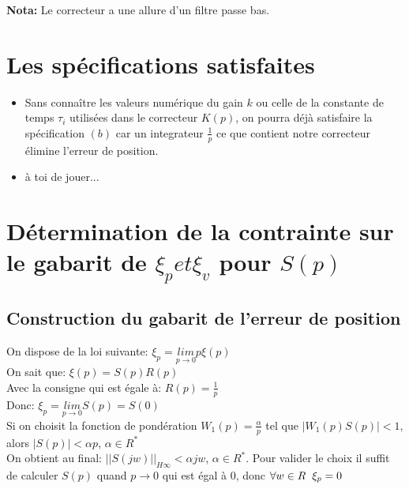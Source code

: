 \documentclass[12pt, a4paper, openany]{report}
\begin{document}
  \begin{center}
    \label{fig3}
  \end{center}

  \textbf{Nota:} \hspace{2mm} Le correcteur a une allure d'un filtre passe bas.

 \section{Les spécifications satisfaites}
 
  \begin{itemize} [label=,font=\small \color{black}]
  	\item Sans connaître les valeurs numérique du gain $k$ ou celle de la constante de temps $\tau_{i}$ utilisées dans le correcteur $K(p)$, on pourra déjà satisfaire la spécification $(b)$ car un integrateur $\frac{1}{p}$ ce que contient notre correcteur élimine l'erreur de position.
    \item à toi de jouer...
  \end{itemize}
 
 \section{Détermination de la contrainte sur le gabarit de $\xi_{p} et \xi_{v} $ pour $S(p)$}  
 
  \subsection{Construction du gabarit de l'erreur de position}
  
   On dispose de la loi suivante: \hspace{5mm} $\xi_{p}=\underset{p\longrightarrow 0}{lim}  p\xi(p)$\\[0.75cm]
   On sait que: \hspace{5mm} $\xi(p)=S(p)R(p)$\\[0.75cm]
   Avec la consigne qui est égale à: \hspace{5mm} $R(p)=\frac{1}{p}$\\[0.75cm]
   Donc: \hspace{5mm} $\xi_{p}=\underset{p\longrightarrow 0}{lim} S(p)=S(0)$\\[0.75cm]
   Si on choisit la fonction de pondération $W_{1}(p)=\frac{\alpha}{p}$ tel que $|W_{1}(p)S(p)|<1$, alors $|S(p)|<\alpha p$, $\alpha \in R^{*}$ \\[0.75cm]
   On obtient au final: \hspace{5mm} $||S(jw)||_{H\infty}<\alpha jw$, $\alpha \in R^{*}$. Pour valider le choix il suffit de calculer $S(p)$ quand $p\rightarrow0$ qui est égal à $0$, donc $\forall w \in R \hspace{2mm} \xi_{p}=0$ 
   
\end{document}

